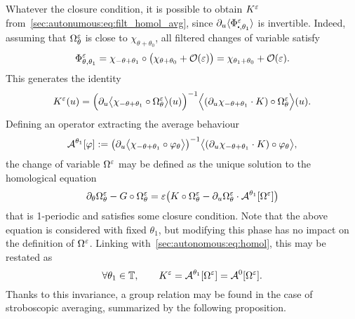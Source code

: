 Whatever the closure condition, it is possible to obtain $K^{\varepsilon}$
from~\eqref{sec:autonumous:eq:filt_homol_avg}, since $\pa_u \LL
\Phi^\eps_{\bigcdot, \theta_1} \RR$ is invertible. Indeed, assuming that
$\Omega^{\varepsilon}_\theta$ is close to $\chi_{\theta + \theta_0}$, all filtered
changes of variable satisfy
\begin{equation*}
  \Phi^{\varepsilon}_{\theta, \theta_1} 
  = \chi_{-\theta + \theta_1} 
    \circ \big( \chi_{\theta + \theta_0} + \mathcal{O}( \varepsilon ) \big)
  = \chi_{\theta_1 + \theta_0} + \mathcal{O}(\varepsilon) .
\end{equation*}
This generates the identity
\begin{equation} \label{sec:autonomous:eq:filt_avg_map}
  K^{\varepsilon}(u) = 
  \Big( \partial_u \big \langle \chi_{-\theta+\theta_1} 
    \circ \Omega^{\varepsilon} _\theta \big \rangle (u) \Big) ^{-1}
  \Big \langle (\partial_u \chi_{-\theta+\theta_1} \cdot K) 
    \circ \Omega^{\varepsilon} _\theta \Big \rangle (u) .
\end{equation}
Defining an operator extracting the average behaviour 
\begin{equation} \label{sec:autonomous:def:avg_op}
  \mathcal{A}^{\theta_1}[\varphi] := 
  \big( \partial_u \big \langle \chi_{-\theta+\theta_1} 
    \circ \varphi_\theta \big \rangle \big) ^{-1} 
  \big \langle (\partial_u \chi_{-\theta+\theta_1} \cdot K) 
    \circ \varphi _\theta \big \rangle , 
\end{equation}
the change of variable $\Omega^{\varepsilon}$ may be
defined as the unique solution to the homological equation 
\begin{equation} \label{sec:autonomous:eq:only_Omega_homol}
  \partial_\theta \Omega^{\varepsilon} _\theta - G \circ \Omega^{\varepsilon} _\theta
  = \varepsilon \big( K \circ \Omega^{\varepsilon} _\theta 
    - \partial_u \Omega^{\varepsilon} _\theta \cdot \mathcal{A}^{\theta_1}[\Omega^{\varepsilon}] 
  \big) 
\end{equation}
that is 1-periodic and satisfies some closure condition. Note that the
above equation is considered with fixed $\theta_1$, but modifying this
phase has no impact on the definition of $\Omega^{\varepsilon}$. Linking
with~\eqref{sec:autonomous:eq:homol}, this may be restated as
\begin{equation*}
  \forall \theta_1 \in \mathbb{T}, \qquad
  K^{\varepsilon} = \mathcal{A}^{\theta_1}[\Omega^{\varepsilon}] 
  = \mathcal{A}^{0}[\Omega^{\varepsilon}] . 
\end{equation*}
Thanks to this invariance, a group relation may be found in the case of
stroboscopic averaging, summarized by the following proposition.

%

